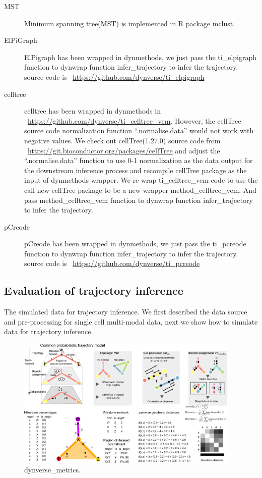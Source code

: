 \begin{description}
	\item[MST] 
	Minimum spanning tree(MST) is implemented in R package mclust.
	\item[ElPiGraph] 
	ElPigraph has been wrapped in dynmethods, we just pass the ti\_elpigraph function to dynwrap function infer\_trajectory to infer the trajectory. source code is ~\url{https://github.com/dynverse/ti_elpigraph}
	\item[celltree] 
	celltree has been wrapped in dynmethods in ~\url{https://github.com/dynverse/ti\_celltree\_vem}. However, the cellTree source code normalization function ``.normalise.data'' would not work with negative values. We check out cellTree(1.27.0) source code from ~\url{https://git.bioconductor.org/packages/cellTree} and adjust the ``.normalise.data'' function to use 0-1 normalization as the data output for the downstream inference process and recompile cellTree package as the input of dynmethods wrapper. We re-wrap ti\_celltree\_vem code to use the call new cellTree package to be a new wrapper method\_celltree\_vem. And pass method\_celltree\_vem function to dynwrap function infer\_trajectory to infer the trajectory.
	\item[pCreode] 
	pCreode has been wrapped in dynmethods, we just pass the ti\_pcreode function to dynwrap function infer\_trajectory to infer the trajectory. source code is ~\url{https://github.com/dynverse/ti\_pcreode}
\end{description}

\subsection{Evaluation of trajectory inference}
The simulated data for trajectory inference. We first described the data source and pre-processing for single cell multi-modal data, next we show how to simulate data for trajectory inference.
\begin{figure}[!ht]
	\centering
	\includegraphics[width=0.95\textwidth]{dynverse_metrics/fig}
	\vspace{0.1cm}
	\caption[dynverse\_metrics]{
	dynverse\_metrics.}
	\label{fig:dynverse_metrics}
\end{figure}

